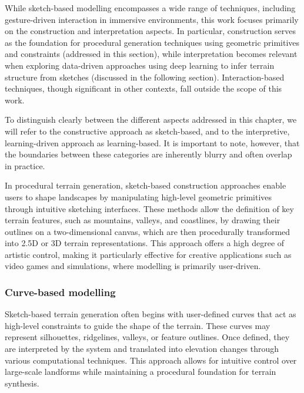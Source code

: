 While sketch-based modelling encompasses a wide range of techniques, including gesture-driven interaction in immersive environments, this work focuses primarily on the construction and interpretation aspects. In particular, construction serves as the foundation for procedural generation techniques using geometric primitives and constraints (addressed in this section), while interpretation becomes relevant when exploring data-driven approaches using deep learning to infer terrain structure from sketches (discussed in the following section). Interaction-based techniques, though significant in other contexts, fall outside the scope of this work.

To distinguish clearly between the different aspects addressed in this chapter, we will refer to the constructive approach as sketch-based, and to the interpretive, learning-driven approach as learning-based. It is important to note, however, that the boundaries between these categories are inherently blurry and often overlap in practice.

In procedural terrain generation, sketch-based construction approaches enable users to shape landscapes by manipulating high-level geometric primitives through intuitive sketching interfaces. These methods allow the definition of key terrain features, such as mountains, valleys, and coastlines, by drawing their outlines on a two-dimensional canvas, which are then procedurally transformed into 2.5D or 3D terrain representations. This approach offers a high degree of artistic control, making it particularly effective for creative applications such as video games and simulations, where modelling is primarily user-driven.

\subsubsection{Curve-based modelling}

Sketch-based terrain generation often begins with user-defined curves that act as high-level constraints to guide the shape of the terrain. These curves may represent silhouettes, ridgelines, valleys, or feature outlines. Once defined, they are interpreted by the system and translated into elevation changes through various computational techniques. This approach allows for intuitive control over large-scale landforms while maintaining a procedural foundation for terrain synthesis.

